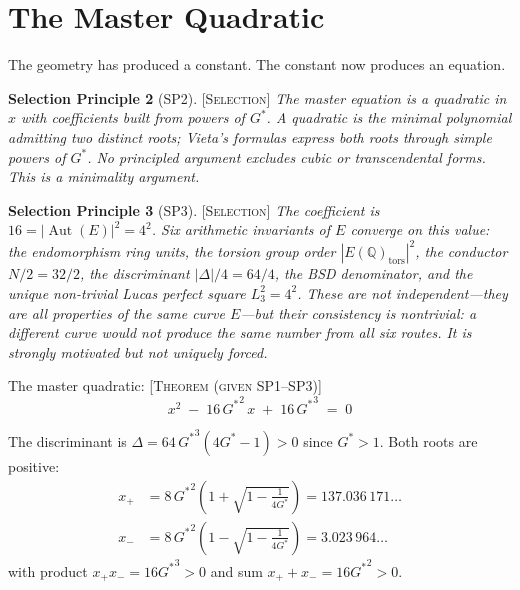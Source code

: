 \documentclass[12pt]{article}
\newcommand{\QQ}{\mathbb{Q}}
\DeclareMathOperator{\Aut}{Aut}
\newcommand{\etag}[1]{{\normalfont\textsc{\footnotesize [#1]}}}
\theoremstyle{compact}
\begin{document}
\section{The Master Quadratic}
\label{sec:quadratic}

The geometry has produced a constant. The constant now produces an equation.

\smallskip
\noindent\textbf{Selection Principle 2} (SP2). \etag{Selection} \textit{The master equation is a quadratic in $x$ with coefficients built from powers of ${G^{*}}$. A quadratic is the minimal polynomial admitting two distinct roots; Vieta's formulas express both roots through simple powers of ${G^{*}}$. No principled argument excludes cubic or transcendental forms. This is a minimality argument.}

\smallskip
\noindent\textbf{Selection Principle 3} (SP3). \etag{Selection} \textit{The coefficient is $16 = |\Aut(E)|^2 = 4^2$. Six arithmetic invariants of $E$ converge on this value: the endomorphism ring units, the torsion group order $|E(\QQ)_{\mathrm{tors}}|^2$, the conductor $N/2 = 32/2$, the discriminant $|\Delta|/4 = 64/4$, the BSD denominator, and the unique non-trivial Lucas perfect square $L_3^2 = 4^2$. These are not independent---they are all properties of the same curve $E$---but their consistency is nontrivial: a different curve would not produce the same number from all six routes. It is strongly motivated but not uniquely forced.}

\smallskip

The master quadratic: \etag{Theorem (given SP1--SP3)}
\begin{equation}
\label{eq:master}
x^2 \;-\; 16\,{G^{*}}^2\, x \;+\; 16\,{G^{*}}^3 \;=\; 0
\end{equation}

The discriminant is $\Delta = 64\,{G^{*}}^3(4{G^{*}} - 1) > 0$ since ${G^{*}} > 1$. Both roots are positive:
\begin{align}
x_+ &= 8\,{G^{*}}^2\!\left(1 + \sqrt{1 - \tfrac{1}{4{G^{*}}}}\right) = 137.036\,171\ldots \label{eq:xplus} \\
x_- &= 8\,{G^{*}}^2\!\left(1 - \sqrt{1 - \tfrac{1}{4{G^{*}}}}\right) = 3.023\,964\ldots \label{eq:xminus}
\end{align}
with product $x_+ x_- = 16{G^{*}}^3 > 0$ and sum $x_+ + x_- = 16{G^{*}}^2 > 0$.

\smallskip
\end{document}
